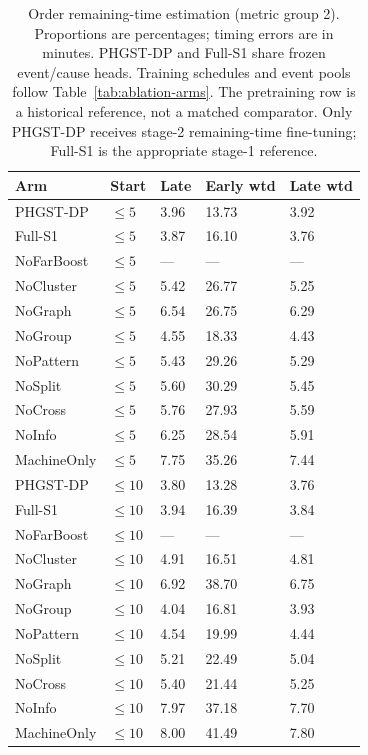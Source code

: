 \begin{table}[p]
\centering
\scriptsize
\setlength{\tabcolsep}{3pt}
\renewcommand{\arraystretch}{1.12}
\caption{Order remaining-time estimation (metric group 2). Proportions are percentages; timing errors are in minutes. PHGST-DP and Full-S1 share frozen event/cause heads. Training schedules and event pools follow Table~\ref{tab:ablation-arms}. The pretraining row is a historical reference, not a matched comparator. Only PHGST-DP receives stage-2 remaining-time fine-tuning; Full-S1 is the appropriate stage-1 reference.}
\label{tab:complete-5-2}
\begin{tabularx}{\textwidth}{@{}lXXXX@{}}
\toprule
Arm & Start & Late & Early wtd & Late wtd \\
\midrule
PHGST-DP & $\le 5$ & 3.96 & 13.73 & 3.92 \\
Full-S1 & $\le 5$ & 3.87 & 16.10 & 3.76 \\
NoFarBoost & $\le 5$ & --- & --- & --- \\
NoCluster & $\le 5$ & 5.42 & 26.77 & 5.25 \\
NoGraph & $\le 5$ & 6.54 & 26.75 & 6.29 \\
NoGroup & $\le 5$ & 4.55 & 18.33 & 4.43 \\
NoPattern & $\le 5$ & 5.43 & 29.26 & 5.29 \\
NoSplit & $\le 5$ & 5.60 & 30.29 & 5.45 \\
NoCross & $\le 5$ & 5.76 & 27.93 & 5.59 \\
NoInfo & $\le 5$ & 6.25 & 28.54 & 5.91 \\
MachineOnly & $\le 5$ & 7.75 & 35.26 & 7.44 \\
\midrule
PHGST-DP & $\le 10$ & 3.80 & 13.28 & 3.76 \\
Full-S1 & $\le 10$ & 3.94 & 16.39 & 3.84 \\
NoFarBoost & $\le 10$ & --- & --- & --- \\
NoCluster & $\le 10$ & 4.91 & 16.51 & 4.81 \\
NoGraph & $\le 10$ & 6.92 & 38.70 & 6.75 \\
NoGroup & $\le 10$ & 4.04 & 16.81 & 3.93 \\
NoPattern & $\le 10$ & 4.54 & 19.99 & 4.44 \\
NoSplit & $\le 10$ & 5.21 & 22.49 & 5.04 \\
NoCross & $\le 10$ & 5.40 & 21.44 & 5.25 \\
NoInfo & $\le 10$ & 7.97 & 37.18 & 7.70 \\
MachineOnly & $\le 10$ & 8.00 & 41.49 & 7.80 \\

\end{tabularx}
\end{table}
